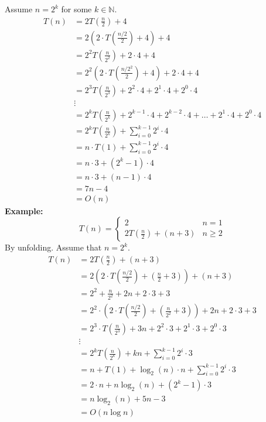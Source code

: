 \documentclass[openany]{report}
\begin{document}
Assume $n=2^k$ for some $k \in \mathbb{N}$. 
\begin{align*}
    T(n) &= 2T\left(\frac{n}{2}\right) + 4\\
    &= 2 \left(2 \cdot T\left(\frac{n/2}{2}\right) + 4 \right) + 4\\
    &= 2^2 T\left(\frac{n}{2^2}\right) + 2\cdot 4 + 4\\
    &= 2^2 \left(2 \cdot T\left(\frac{n/2^2}{2}\right) + 4 \right) + 2\cdot 4 + 4\\
    &= 2^3 T\left(\frac{n}{2^3}\right) + 2^2\cdot 4 + 2^1\cdot4 + 2^0\cdot4\\
    &\vdots\\
    &= 2^k T\left(\frac{n}{2^k}\right) + 2^{k-1}\cdot 4 + 2^{k-2} \cdot 4 + \ldots + 2^1\cdot 4 + 2^0\cdot 4\\
    &= 2^k T\left(\frac{n}{2^k}\right) +\sum_{i=0}^{k-1}2^i \cdot 4\\
    &= n \cdot T(1) + \sum_{i=0}^{k-1}2^i \cdot 4\tag{$n = 2k$}\\
    &= n \cdot 3 + (2^k - 1)\cdot 4\\
    &= n\cdot 3 + (n-1)\cdot 4\\
    &= 7n - 4\\
    &= O(n)
\end{align*}
\noindent
\textbf{Example:}
\[
    T(n) = 
\begin{cases}
    2 & n=1\\
    2T\left(\frac{n}{2}\right) + (n+3) & n \geq 2
\end{cases}
\]
By unfolding. Assume that $n = 2^k$. 
\begin{align*}
    T(n) &= 2T\left(\frac{n}{2}\right) + (n+3)\\
    &= 2 \left(2 \cdot T\left(\frac{n/2}{2}\right) + \left(\frac{n}{2} + 3\right)\right) + (n+3)\\
    &= 2^2 + \frac{n}{2^2} + 2n + 2\cdot 3 + 3\\
    &= 2^2 \cdot \left(2\cdot T\left(\frac{n/2}{2}\right) + \left(\frac{n}{2^2} + 3\right)\right) + 2n + 2\cdot 3 + 3\\
    &= 2^3 \cdot T\left(\frac{n}{2^3}\right) + 3n + 2^2\cdot 3 + 2^1\cdot 3 + 2^0\cdot 3\\
    &\vdots\\
    &= 2^k T\left(\frac{n}{2^k}\right) + kn + \sum_{i=0}^{k-1} 2^i \cdot 3\\
    &= n + T(1) + \log_2(n)\cdot n + \sum_{i=0}^{k-1} 2^i \cdot 3\tag{$n = 2^k$}\\
    &= 2\cdot n + n\log_2(n) + (2^k - 1)\cdot 3\\
    &= n\log_2(n) + 5n -3 \\
    &= O(n\log n)
\end{align*}
\end{document}

